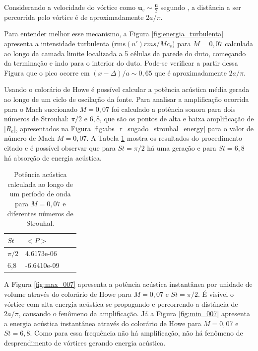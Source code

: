 \begin{figure}[ht!]
\centering
  
\end{figure}

Considerando a velocidade do vórtice como $\textbf{u}_{v} \sim \frac{\textbf{u}}{2}$ segundo , a distância a ser percorrida pelo vórtice é de aproximadamente $2a/\pi$. 

Para entender melhor esse mecanismo, a Figura \ref{fig:energia_turbulenta} apresenta a intensidade turbulenta ($\text{rms}(u')rms/Mc_{s}$) para $M = 0,07$ calculada ao longo da camada limite localizada a 5 células da parede do duto, começando da terminação e indo para o interior do duto. Pode-se verificar a partir dessa Figura que o pico ocorre em $(x - \Delta)/a \sim 0,65$ que é aproximadamente $2a/\pi$.

\newpage
\begin{figure}[ht!]
\centering
  
\end{figure}

Usando o colorário de Howe é possível calcular a potência acústica média gerada ao longo de um ciclo de oscilação da fonte. Para analisar a amplificação ocorrida para o Mach succionado $M = 0,07$ foi calculado a potência sonora para dois números de Strouhal: $\pi/2$ e $6,8$, que são os pontos de alta e baixa amplificação de $|R_{e}|$, apresentados na Figura \ref{fig:abs_r_sugado_strouhal_energy} para o valor de número de Mach $M = 0,07$. A Tabela \ref{table:potencia} mostra os resultados do procedimento citado e é possível observar que para $St = \pi/2$ há uma geração e para $St = 6,8$ há absorção de energia acústica. 

\begin{table}[ht!]
\centering
\caption{Potência acústica calculada ao longo de um período de onda para $M = 0,07$ e diferentes números de Strouhal.}
\label{table:potencia}
    \begin{tabular}{|l|l|l|l|}
        \hline
        $St$ & $<P>$ \\ \hline
        $\pi/2$ & 4.6173e-06  \\ \hline  
        6,8 & -6.6410e-09 \\ \hline
    \end{tabular}
\end{table} 


A Figura \ref{fig:max_007} apresenta a potência acústica instantânea por unidade de volume através do colorário de Howe para $M = 0,07$ e $St = \pi/2$. É visível o vórtice com alta energia acústica se propagando e percorrendo a distância de $2a/\pi$, causando o fenômeno da amplificação. Já a Figura \ref{fig:min_007} apresenta a energia acústica instantânea através do colorário de Howe para $M = 0,07$ e $St = 6,8$. Como para essa frequência não há amplificação, não há fenômeno de desprendimento de vórtices gerando energia acústica.   

